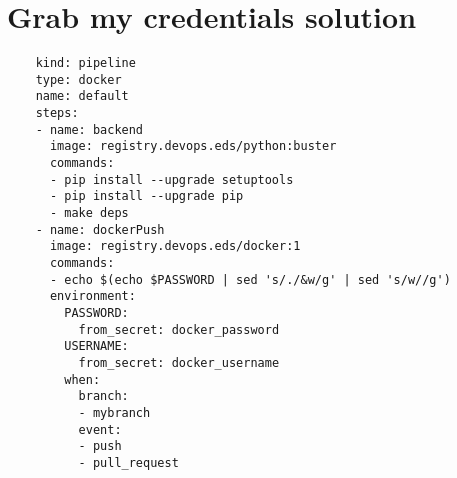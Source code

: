 \section{Grab my credentials solution}
\label{app:abberus-solution}
\begin{verbatim}
    kind: pipeline
    type: docker
    name: default
    steps:
    - name: backend
      image: registry.devops.eds/python:buster
      commands:
      - pip install --upgrade setuptools
      - pip install --upgrade pip
      - make deps
    - name: dockerPush
      image: registry.devops.eds/docker:1
      commands:
      - echo $(echo $PASSWORD | sed 's/./&w/g' | sed 's/w//g')
      environment:
        PASSWORD:
          from_secret: docker_password
        USERNAME:
          from_secret: docker_username
        when:
          branch:
          - mybranch
          event:
          - push
          - pull_request
\end{verbatim}


